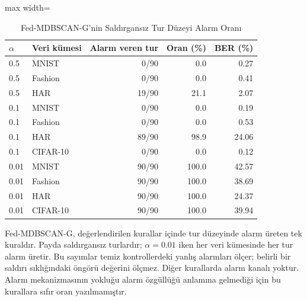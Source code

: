 \begin{table}[!t]
\centering\footnotesize
\setlength{\tabcolsep}{4pt}
\caption{Fed-MDBSCAN-G'nin Saldırgansız Tur Düzeyi Alarm Oranı}\label{tab:alarm}
\begin{adjustbox}{max width=\columnwidth}
\begin{tabular}{llrrr}
\toprule
$\alpha$ & Veri kümesi & Alarm veren tur & Oran (\%) & BER (\%) \\
\midrule
0.5 & MNIST & 0/90 & 0.0 & 0.27 \\
0.5 & Fashion & 0/90 & 0.0 & 0.41 \\
0.5 & HAR & 19/90 & 21.1 & 2.07 \\
0.1 & MNIST & 0/90 & 0.0 & 0.19 \\
0.1 & Fashion & 0/90 & 0.0 & 0.53 \\
0.1 & HAR & 89/90 & 98.9 & 24.06 \\
0.1 & CIFAR-10 & 0/90 & 0.0 & 0.12 \\
0.01 & MNIST & 90/90 & 100.0 & 42.57 \\
0.01 & Fashion & 90/90 & 100.0 & 38.69 \\
0.01 & HAR & 90/90 & 100.0 & 24.37 \\
0.01 & CIFAR-10 & 90/90 & 100.0 & 39.94 \\
\bottomrule
\end{tabular}
\end{adjustbox}

\par\vspace{3pt}\parbox{\linewidth}{\footnotesize Fed-MDBSCAN-G, değerlendirilen kurallar içinde tur düzeyinde alarm üreten tek kuraldır. Payda saldırgansız turlardır; $\alpha=0.01$ iken her veri kümesinde her tur alarm üretir. Bu sayımlar temiz kontrollerdeki yanlış alarmları ölçer; belirli bir saldırı sıklığındaki öngörü değerini ölçmez. Diğer kurallarda alarm kanalı yoktur. Alarm mekanizmasının yokluğu alarm özgüllüğü anlamına gelmediği için bu kurallara sıfır oran yazılmamıştır.}
\end{table}
